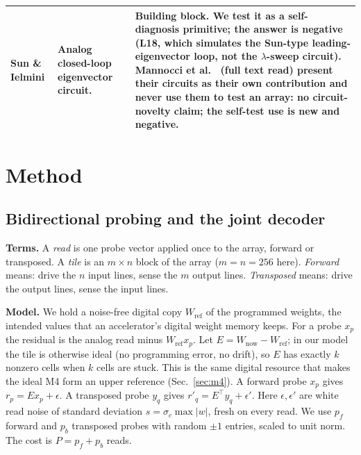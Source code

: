 \documentclass[journal]{IEEEtran}
\newcommand{\mfour}{\textsc{M4}}
\begin{document}
\begin{table}[t]
\begin{tabular}{p{2.6cm}p{5.3cm}p{8.6cm}}
\\
Sun \& Ielmini \cite{sun2020eigen} & Analog closed-loop eigenvector circuit. & Building block. We test it as a self-diagnosis primitive; the answer is negative (L18, which simulates the Sun-type leading-eigenvector loop, not the $\lambda$-sweep circuit). Mannocci et al.\ \cite{mannocci2024,mannocci2023block} (full text read) present their circuits as their own contribution and never use them to test an array: \textbf{no circuit-novelty claim}; the self-test use is new and negative. \\
\bottomrule
\end{tabular}
\end{table}
\section{Method}
\label{sec:method}
\subsection{Bidirectional probing and the joint decoder}
\label{sec:a5}
\textbf{Terms.} A \emph{read} is one probe vector applied once to the array, forward or transposed. A \emph{tile} is an $m\times n$ block of the array ($m=n=256$ here). \emph{Forward} means: drive the $n$ input lines, sense the $m$ output lines. \emph{Transposed} means: drive the output lines, sense the input lines.

\textbf{Model.} We hold a noise-free digital copy $W_{\mathrm{ref}}$ of the programmed weights, the intended values that an accelerator's digital weight memory keeps. For a probe $x_p$ the residual is the analog read minus $W_{\mathrm{ref}}x_p$. Let $E=W_{\mathrm{now}}-W_{\mathrm{ref}}$; in our model the tile is otherwise ideal (no programming error, no drift), so $E$ has exactly $k$ nonzero cells when $k$ cells are stuck. This is the same digital resource that makes the ideal \mfour{} form an upper reference (Sec.~\ref{sec:m4}).
A forward probe $x_p$ gives $r_p=Ex_p+\epsilon$. A transposed probe $y_q$ gives $r'_q=E^{\top}y_q+\epsilon'$. Here $\epsilon,\epsilon'$ are white read noise of standard deviation $s=\sigma_c\max|w|$, fresh on every read. We use $p_f$ forward and $p_b$ transposed probes with random $\pm1$ entries, scaled to unit norm. The cost is $P=p_f+p_b$ reads.
\end{document}
